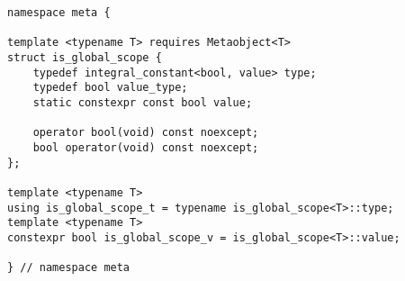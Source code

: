 
\begin{verbatim}
namespace meta {

template <typename T> requires Metaobject<T>
struct is_global_scope {
	typedef integral_constant<bool, value> type;
	typedef bool value_type;
	static constexpr const bool value;

	operator bool(void) const noexcept;
	bool operator(void) const noexcept;
};

template <typename T>
using is_global_scope_t = typename is_global_scope<T>::type;
template <typename T>
constexpr bool is_global_scope_v = is_global_scope<T>::value;

} // namespace meta
\end{verbatim}
